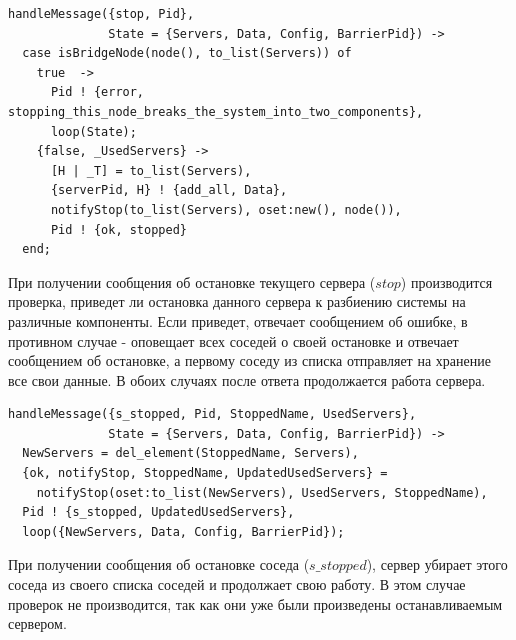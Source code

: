 			\begin{lstlisting}
handleMessage({stop, Pid}, 
              State = {Servers, Data, Config, BarrierPid}) -> 
  case isBridgeNode(node(), to_list(Servers)) of
    true  -> 
	  Pid ! {error, stopping_this_node_breaks_the_system_into_two_components},
      loop(State);
    {false, _UsedServers} ->
	  [H | _T] = to_list(Servers),
      {serverPid, H} ! {add_all, Data},
      notifyStop(to_list(Servers), oset:new(), node()),    
      Pid ! {ok, stopped}
  end;				
			\end{lstlisting}
			При получении сообщения об остановке текущего сервера ($stop$) производится проверка, приведет ли остановка данного сервера к разбиению системы на различные компоненты. 
			Если приведет, отвечает сообщением об ошибке, в противном случае - оповещает всех соседей о своей остановке и отвечает сообщением об остановке, а первому соседу из списка 
			отправляет на хранение все свои данные. В обоих случаях после ответа продолжается работа сервера.

			\begin{lstlisting}
handleMessage({s_stopped, Pid, StoppedName, UsedServers}, 
              State = {Servers, Data, Config, BarrierPid}) ->
  NewServers = del_element(StoppedName, Servers),
  {ok, notifyStop, StoppedName, UpdatedUsedServers} = 
    notifyStop(oset:to_list(NewServers), UsedServers, StoppedName),
  Pid ! {s_stopped, UpdatedUsedServers},
  loop({NewServers, Data, Config, BarrierPid});				
			\end{lstlisting}
			При получении сообщения об остановке соседа ($s\_stopped$), сервер убирает этого соседа из своего списка соседей и продолжает свою работу. В этом случае проверок не производится, 
			так как они уже были произведены останавливаемым сервером. 

